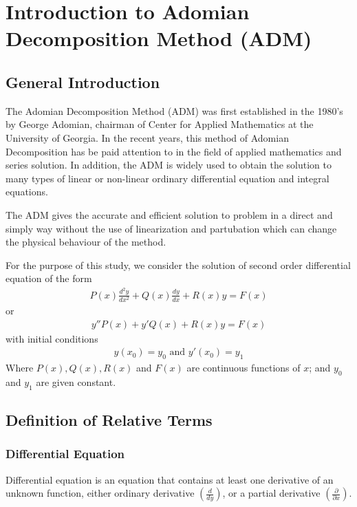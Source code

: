 \documentclass[11pt]{report}
\newcommand{\dsp}{\displaystyle}
\newcommand{\sprime}{'}
\newcommand{\dprime}{''}
\begin{document}
	\newpage
	\tableofcontents
	
	\newpage
	\chapter{Introduction to Adomian Decomposition Method (ADM)}	
	\section{General Introduction}
	The Adomian Decomposition Method (ADM) was first established in the 1980's by George Adomian, chairman of Center for Applied Mathematics at the University of Georgia. In the recent years, this method of Adomian Decomposition has be paid attention to in the field of applied mathematics and series solution. In addition, the ADM is widely used to obtain the solution to many types of linear or non-linear ordinary differential equation and integral equations.
	
	The ADM gives the accurate and efficient solution to problem in a direct and simply way without the use of linearization and partubation which can change the physical behaviour of the method.
	
	For the purpose of this study, we consider the solution of second order differential equation of the form 
	\begin{eqnarray*}
		P(x)\frac{d^2y}{dx^2}+ Q(x)\frac{dy}{dx} + R(x)y = F(x)
	\end{eqnarray*}
	or
	\begin{eqnarray*}
		y\dprime P(x) + y\sprime Q(x) + R(x)y=F(x)
	\end{eqnarray*}
	with initial conditions
	\begin{eqnarray*}
		y(x_0) = y_0 \text{ and } y\sprime(x_0) = y_1
	\end{eqnarray*}
	Where $P(x), Q(x), R(x)$ and $F(x)$ are continuous functions of $x$; and $y_0$ and $y_1$ are given constant.
	
	\section{Definition of Relative Terms}
	\subsection{Differential Equation}
	Differential equation is an equation that contains at least one derivative of an unknown function, either ordinary derivative $\dsp\left(\frac{d}{dy}\right)$, or a partial derivative $\dsp\left(\frac{\partial}{\partial x}\right)$.
	
\end{document}
